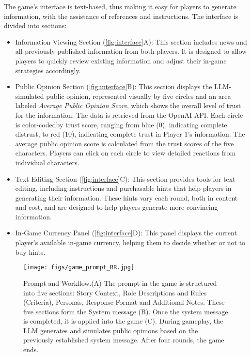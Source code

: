 The game’s interface is text-based, thus making it easy for players to generate information, with the assistance of references and instructions. The interface is divided into sections:
\begin{itemize}
    \item Information Viewing Section (\autoref{fig:interface}A): This section includes news and all previously published information from both players. It is designed to allow players to quickly review existing information and adjust their in-game strategies accordingly.
    \item Public Opinion Section (\autoref{fig:interface}B): This section displays the LLM-simulated public opinion, represented visually by five circles and an area labeled \textit{Average Public Opinion Score}, which shows the overall level of trust for the information. The data is retrieved from the OpenAI API. Each circle is color-codedby trust score, ranging from blue (0), indicating complete distrust, to red (10), indicating complete trust in Player 1's information. The average public opinion score is calculated from the trust scores of the five characters. Players can click on each circle to view detailed reactions from individual characters.
    \item Text Editing Section (\autoref{fig:interface}C): This section provides tools for text editing, including instructions and purchasable hints that help players in generating their information. These hints vary each round, both in content and cost, and are designed to help players generate more convincing information.
    \item In-Game Currency Panel (\autoref{fig:interface}D): This panel displays the current player’s available in-game currency, helping them to decide whether or not to buy hints.
\end{itemize}

\begin{figure}[htbp]
    \centering
    \texttt{[image: figs/game\_prompt\_RR.jpg]}
    \caption{Prompt and Workflow.(A) The prompt in the game is structured into five sections: Story Context, Role Descriptions and Rules (Criteria), Personas, Response Format and Additional Notes. These five sections form the System message (B). Once the system message is completed, it is applied into the game (C). During gameplay, the LLM generates and simulates public opinions based on the previously established system message. After four rounds, the game ends.}
    \label{fig:prompt}
\end{figure}
